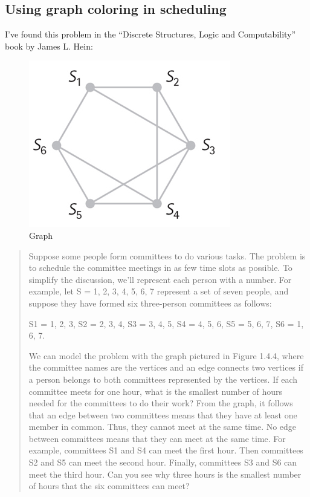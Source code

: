 \subsection{Using graph coloring in scheduling}

I've found this problem in the ``Discrete Structures, Logic and Computability'' book by James L. Hein:

\begin{figure}[H]
\centering
\includegraphics[scale=0.75]{color/fig144.png}
\caption{Graph}
\end{figure}

\begin{framed}
\begin{quotation}
Suppose some people form committees to do various tasks. The problem is to schedule the committee meetings in as few time slots as possible.
To simplify the discussion, we’ll represent each person with a number. For example, let S = {1, 2, 3, 4, 5, 6, 7} represent a set of seven people, and suppose they have formed six three-person committees as follows:

S1 = {1, 2, 3}, S2 = {2, 3, 4}, S3 = {3, 4, 5}, S4 = {4, 5, 6}, S5 = {5, 6, 7}, S6 = {1, 6, 7}.

We can model the problem with the graph pictured in Figure 1.4.4, where the committee names are the vertices and an edge connects two vertices if a person belongs to both committees represented by the vertices.
If each committee meets for one hour, what is the smallest number of hours needed for the committees to do their work?
From the graph, it follows that an edge between two committees means that they have at least one member in common.
Thus, they cannot meet at the same time. No edge between committees means that they can meet at the same time.
For example, committees S1 and S4 can meet the first hour. Then committees S2 and S5 can meet the second hour.
Finally, committees S3 and S6 can meet the third hour. Can you see why three hours is the smallest number of hours that the six committees can meet?
\end{quotation}
\end{framed}

